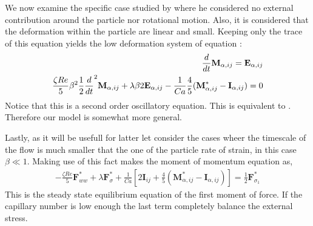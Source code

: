 We now examine the specific case studied by \citet{lamb1924hydrodynamics} where he considered no external contribution around the particle nor rotational motion.
Also, it is considered that the deformation within the particle are linear and small. 
Keeping only the trace of this equation yields the low deformation system of equation :
\begin{align*}
    \frac{d}{d t} \textbf{M}_{\alpha,ij} = \textbf{E}_{\alpha,ij}\\
    \frac{\zeta Re}{5}
        \beta^2 \frac{1}{2}\frac{d}{d t}^2 \textbf{M}_{\alpha,ij}
    + \lambda 
        \beta 2\textbf{E}_{\alpha,ij}
    - \frac{1}{Ca} 
     \frac{4  }{5} (\textbf{M}_{\alpha,ij}^* - \textbf{I}_{\alpha,ij})
    = 0
\end{align*}
Notice that this is a second order oscillatory equation. 
This is equivalent to  \citet{lamb1924hydrodynamics}. 
Therefore our model is somewhat more general. 

Lastly, as it will be usefull for latter let consider the cases wheer the timescale of the flow is much smaller that the one of the particle rate of strain, in this case $\beta \ll 1$. 
Making use of this fact makes the moment of momentum equation as, 
\begin{align*}
    - \frac{\zeta Re}{5}
     \textbf{F}_{ww}^*
    + \lambda  
    \textbf{F}_\sigma^*
    + \frac{1}{Ca} \left[
    2\textbf{I}_{ij} 
    + \frac{4  }{5} (\textbf{M}_{\alpha,ij}^* - \textbf{I}_{\alpha,ij})
    \right]
    = 
    \frac{1}{2}
    \textbf{F}_{\sigma_1}^*
\end{align*}
This is the steady state equilibrium equation of the first moment of force. 
If the capillary number is low enough the last term  completely balance the external stress. 
